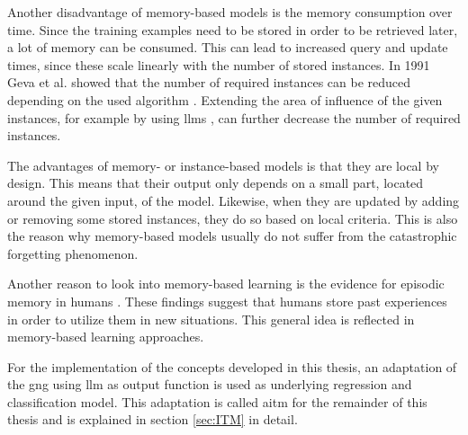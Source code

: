 Another disadvantage of memory-based models is the memory consumption over time. Since the training examples need to be stored in order to be retrieved later, a lot of memory can be consumed. This can lead to increased query and update times, since these scale linearly with the number of stored instances. In 1991 Geva et al. showed that the number of required instances can be reduced depending on the used algorithm \cite{protReduction}. Extending the area of influence of the given instances, for example by using \glspl{llm} \cite{LLM}, can further decrease the number of required instances.

The advantages of memory- or instance-based models is that they are local by design. This means that their output only depends on a small part, located around the given input, of the model. Likewise, when they are updated by adding or removing some stored instances, they do so based on local criteria. This is also the reason why memory-based models usually do not suffer from the catastrophic forgetting phenomenon.

Another reason to look into memory-based learning is the evidence for episodic memory in humans \cite{tulving2002episodic}. 
These findings suggest that humans store past experiences in order to utilize them in new situations. This general idea is reflected in memory-based learning approaches.

For the implementation of the concepts developed in this thesis, an adaptation of the \gls{gng} using \gls{llm} as output function is used as underlying regression and classification model. This adaptation is called \gls{aitm} for the remainder of this thesis and is explained in section \ref{sec:ITM} in detail.

%
%
%

